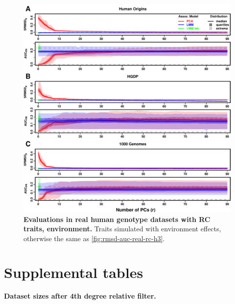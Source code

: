 \documentclass[11pt]{article}
\begin{document}
\begin{figure}[hp!]
  \centering
  \includegraphics[width=\textwidth,height=\textheight,keepaspectratio]{m_causal_fac-27/h0.3/env0.3-0.2/rmsd-auc-real.pdf}
  \caption{
    {\bf Evaluations in real human genotype datasets with RC traits, environment.}
    Traits simulated with environment effects, otherwise the same as \cref{fig:rmsd-auc-real-rc-h3}.
  }
  \label{fig:rmsd-auc-real-rc-env}
\end{figure}


\clearpage

\section*{Supplemental tables}

\begin{table}[hb!]
  \centering
  \caption{
    \textbf{Dataset sizes after 4th degree relative filter.}
  }
  \label{tab:king_cutoff}
\end{table}
\end{document}
